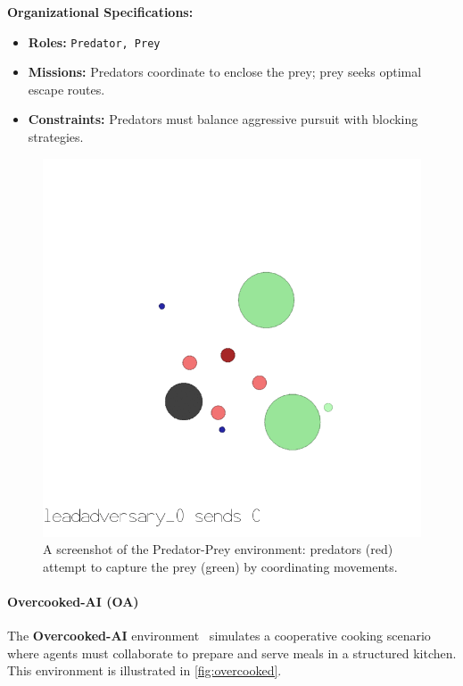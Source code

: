 \documentclass[pdflatex,sn-mathphys-num]{sn-jnl}%
\theoremstyle{thmstyleone}%
\theoremstyle{thmstyletwo}%
\theoremstyle{thmstylethree}%
\begin{document}
\textbf{Organizational Specifications:} 
\begin{itemize}
    \item \textbf{Roles:} \texttt{Predator, Prey}
    \item \textbf{Missions:} Predators coordinate to enclose the prey; prey seeks optimal escape routes.
    \item \textbf{Constraints:} Predators must balance aggressive pursuit with blocking strategies.
\end{itemize}

\begin{figure}[h!]
    \centering
    \includegraphics[width=0.7\linewidth]{figures/predator_prey.png}
    \caption{A screenshot of the Predator-Prey environment: predators (red) attempt to capture the prey (green) by coordinating movements.}
    \label{fig:predator_prey}
\end{figure}

\paragraph{Overcooked-AI (OA)}
The \textbf{Overcooked-AI} environment~\cite{overcookedai} simulates a cooperative cooking scenario where agents must collaborate to prepare and serve meals in a structured kitchen. This environment is illustrated in \autoref{fig:overcooked}.
\end{document}
